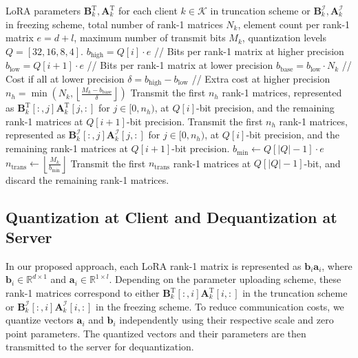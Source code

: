 \documentclass[journal]{IEEEtran}
\begin{document}
\begin{algorithm}
\caption{Importance-Aware Bandwidth-Adaptive Communication Quantization}
\label{alg:adaptive_quantization}
\begin{algorithmic}[1]
\REQUIRE LoRA parameters $\mathbf{B}_k^{\text{T}}, \mathbf{A}_k^{\text{T}}$ for each client $k \in \mathcal{K}$ in truncation scheme or $\mathbf{B}_k^{\mathcal{I}}, \mathbf{A}_k^{\mathcal{I}}$ in freezing scheme, total number of rank-1 matrices $N_k$, element count per rank-1 matrix $e = d + l$, maximum number of transmit bits $M_k$, quantization levels $Q = [32, 16, 8, 4]$.
    \STATE $b_{\text{high}} = Q[i] \cdot e$ \quad // Bits per rank-1 matrix at higher precision
    \STATE $b_{\text{low}} = Q[i+1] \cdot e$ \quad // Bits per rank-1 matrix at lower precision
    \STATE $b_{\text{base}} = b_{\text{low}} \cdot N_k$ \quad // Cost if all at lower precision
    \STATE $\delta = b_{\text{high}} - b_{\text{low}}$ \quad // Extra cost at higher precision
    \STATE $n_h = \min\left(N_k, \left\lfloor \frac{M_k - b_{\text{base}}}{\delta} \right\rfloor\right)$
        \STATE Transmit the first $n_h$ rank-1 matrices, represented as $\mathbf{B}_k^{\text{T}}[:,j]\mathbf{A}_k^{\text{T}}[j,:]$ for $j \in [0, n_h)$, at $Q[i]$-bit precision, and the remaining rank-1 matrices at $Q[i+1]$-bit precision.
        \STATE Transmit the first $n_h$ rank-1 matrices, represented as $\mathbf{B}_k^{\mathcal{I}}[:,j]\mathbf{A}_k^{\mathcal{I}}[j,:]$ for $j \in [0, n_h)$, at $Q[i]$-bit precision, and the remaining rank-1 matrices at $Q[i+1]$-bit precision.
    \ENDIF
    \ENDIF
\ENDFOR
\STATE $b_{\text{min}} \gets Q[|Q|-1] \cdot e$
\STATE $n_{\text{trans}} \gets \left\lfloor \frac{M_k}{b_{\text{min}}} \right\rfloor$
\STATE Transmit the first $n_{\text{trans}}$ rank-1 matrices at $Q[|Q|-1]$-bit, and discard the remaining rank-1 matrices.
\end{algorithmic}
\end{algorithm}




\subsection{Quantization at Client and Dequantization at Server}
In our proposed approach, each LoRA rank-1 matrix is represented as \(\mathbf{b}_i \mathbf{a}_i\), where \(\mathbf{b}_i \in \mathbb{R}^{d \times 1}\) and \(\mathbf{a}_i \in \mathbb{R}^{1 \times l}\). Depending on the parameter uploading scheme, these rank-1 matrices correspond to either \(\mathbf{B}_k^{\text{T}}[:,i]\mathbf{A}_k^{\text{T}}[i,:]\) in the truncation scheme or \(\mathbf{B}_k^{\mathcal{I}}[:,i]\mathbf{A}_k^{\mathcal{I}}[i,:]\) in the freezing scheme. To reduce communication costs, we quantize vectors \(\mathbf{a}_i\) and \(\mathbf{b}_i\) independently using their respective scale and zero point parameters\cite{jacob2018quantization}. The quantized vectors and their parameters are then transmitted to the server for dequantization.
\end{document}
